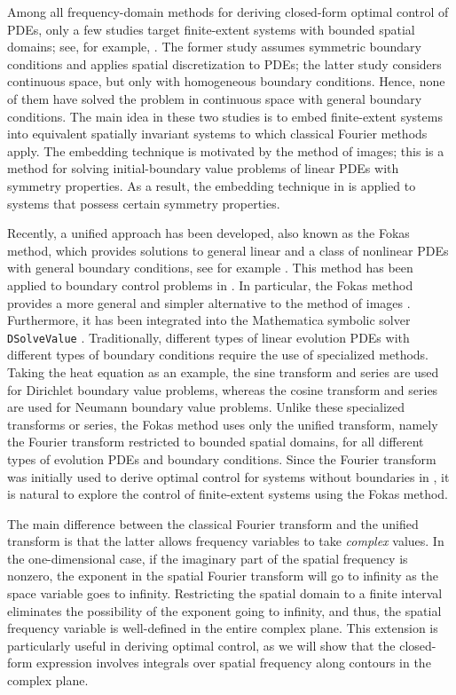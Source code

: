 \documentclass[journal,twoside,web]{ieeecolor}
\begin{document}
Among all frequency-domain methods for deriving closed-form optimal control of PDEs, only a few studies target finite-extent systems with bounded spatial domains; see, for example, \cite{langbort2005distributed,epperlein2016spatially}. 
The former study assumes symmetric boundary conditions and applies spatial discretization to PDEs; the latter study considers continuous space, but only with homogeneous boundary conditions.
Hence, none of them have solved the problem in continuous space with general boundary conditions.
The main idea in these two studies is to embed finite-extent systems into equivalent spatially invariant systems to which classical Fourier methods apply. 
The embedding technique is motivated by the method of images; this is a method for solving initial-boundary value problems of linear PDEs with symmetry properties. 
As a result, the embedding technique in \cite{langbort2005distributed,epperlein2016spatially} is applied to systems that possess certain symmetry properties.

Recently, a unified approach has been developed, also known as the Fokas method, which provides solutions to general linear and a class of nonlinear PDEs with general boundary conditions, see for example \cite{fokas1997unified,fokas2008unified,fokasbook,deconinck2014method}. This method has been applied to boundary control problems in \cite{kalimeris2023numerical}. In particular, the Fokas method provides a more general and simpler alternative to the method of images \cite[Section I.4.2]{fokas2008unified}. Furthermore, it has been integrated into the Mathematica symbolic solver \texttt{DSolveValue} \cite{Mathematica}. Traditionally, different types of linear evolution PDEs with different types of boundary conditions require the use of specialized methods. Taking the heat equation as an example, the sine transform and series are used for Dirichlet boundary value problems, whereas the cosine transform and series are used for Neumann boundary value problems. Unlike these specialized transforms or series, the Fokas method uses only the unified transform, namely the Fourier transform restricted to bounded spatial domains, for all different types of evolution PDEs and boundary conditions. Since the Fourier transform was initially used to derive optimal control for systems without boundaries in \cite{bamieh2002distributed}, it is natural to explore the control of finite-extent systems using the Fokas method. 

The main difference between the classical Fourier transform and the unified transform is that the latter allows frequency variables to take \emph{complex} values.
In the one-dimensional case, if the imaginary part of the spatial frequency is nonzero, the exponent in the spatial Fourier transform will go to infinity as the space variable goes to infinity.
Restricting the spatial domain to a finite interval eliminates the possibility of the exponent going to infinity, and thus, the spatial frequency variable is well-defined in the entire complex plane. 
This extension is particularly useful in deriving optimal control, as we will show that the closed-form expression involves integrals over spatial frequency along contours in the complex plane. 
  
\end{document}

